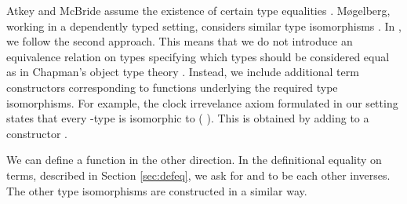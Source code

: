\begin{AgdaAlign}
Atkey and McBride assume the existence of certain type equalities
\cite{atkey2013productive}. M{\o}gelberg, working in a dependently typed setting, considers similar type isomorphisms \cite{Mogelberg14}. In \GTT, we
follow the second approach. This means that we do not introduce an
equivalence relation on types specifying which types should be
considered equal as in Chapman's object type theory
\cite{Chapman09}. Instead, we include additional term constructors
corresponding to functions underlying the required type
isomorphisms. For example, the clock irrevelance axiom formulated in our setting states that every -type  is isomorphic to  ( ). This is obtained by adding to  a constructor .
\begin{code}%
%
\>[4]\AgdaSpace{}%
\AgdaSymbol{:}\AgdaSpace{}%
\AgdaSymbol{\{}\AgdaSpace{}%
\AgdaSymbol{:}\AgdaSpace{}%
\AgdaSpace{}%
\AgdaSymbol{\}}\AgdaSpace{}%
\AgdaSymbol{(}\AgdaSpace{}%
\AgdaSymbol{:}\AgdaSpace{}%
\AgdaSpace{}%
\AgdaSymbol{)}\AgdaSpace{}%
\AgdaSpace{}%
\AgdaSpace{}%
\AgdaSpace{}%
\AgdaSymbol{(}\AgdaSpace{}%
\AgdaSymbol{(}\AgdaSpace{}%
\AgdaSymbol{)}\AgdaSpace{}%
\AgdaSpace{}%
\AgdaSymbol{)}\<%
\end{code}
We can define a function   in the other direction.
In the definitional equality on terms, described in Section \ref{sec:defeq}, we
ask for  and  to be each other inverses.
The other type isomorphisms are constructed in a similar way.
\end{AgdaAlign}

